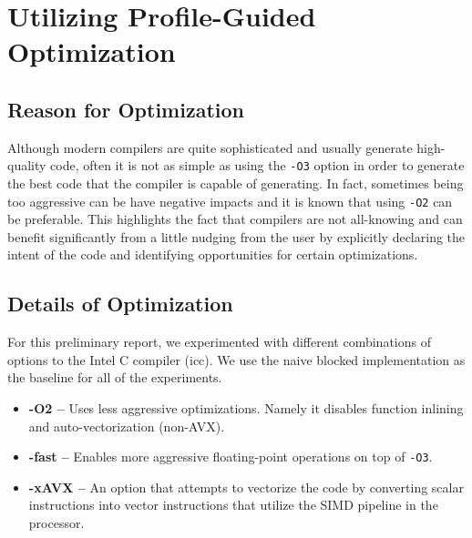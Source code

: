 
\section{Utilizing Profile-Guided Optimization}
\label{sec-opts-prof}

\subsection{Reason for Optimization}

Although modern compilers are quite sophisticated and usually generate
high-quality code, often it is not as simple as using the {\tt{-O3}}
option in order to generate the best code that the compiler is capable of
generating. In fact, sometimes being too aggressive can be have negative
impacts and it is known that using {\tt{-O2}} can be preferable. This
highlights the fact that compilers are not all-knowing and can benefit
significantly from a little nudging from the user by explicitly declaring
the intent of the code and identifying opportunities for certain
optimizations.
\smallskip

\subsection{Details of Optimization}

For this preliminary report, we experimented with different combinations
of options to the Intel C compiler (icc). We use the naive blocked
implementation as the baseline for all of the experiments.
\smallskip

\begin{itemize}
  \item \textbf{-O2 --} Uses less aggressive optimizations. Namely it disables
function inlining and auto-vectorization (non-AVX).

  \item \textbf{-fast --} Enables more aggressive floating-point operations on
top of {\tt{-O3}}.

  \item \textbf{-xAVX --} An option that attempts to vectorize the code by
converting scalar instructions into vector instructions that utilize the
SIMD pipeline in the processor.
\end{itemize}
\smallskip


